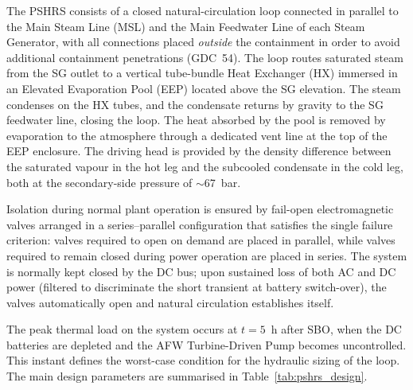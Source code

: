 \documentclass[a4paper,11pt]{article}
\numberwithin{subsubsection}{subsection}
\numberwithin{subsection}{section}
\begin{document}
The PSHRS consists of a closed natural-circulation loop connected in
parallel to the Main Steam Line (MSL) and the Main Feedwater Line of each
Steam Generator, with all connections placed \emph{outside} the containment
in order to avoid additional containment penetrations (GDC~54). The loop
routes saturated steam from the SG outlet to a vertical tube-bundle Heat
Exchanger (HX) immersed in an Elevated Evaporation Pool (EEP) located
above the SG elevation. The steam condenses on the HX tubes, and the
condensate returns by gravity to the SG feedwater line, closing the loop.
The heat absorbed by the pool is removed by evaporation to the atmosphere
through a dedicated vent line at the top of the EEP enclosure. The driving
head is provided by the density difference between the saturated vapour
in the hot leg and the subcooled condensate in the cold leg, both at the
secondary-side pressure of $\sim$67~bar.

Isolation during normal plant operation is ensured by fail-open
electromagnetic valves arranged in a series--parallel configuration that
satisfies the single failure criterion: valves required to open on demand
are placed in parallel, while valves required to remain closed during
power operation are placed in series. The system is normally kept closed
by the DC bus; upon sustained loss of both AC and DC power
(filtered to discriminate the short transient at battery switch-over),
the valves automatically open and natural circulation establishes itself.

The peak thermal load on the system occurs at $t = 5$~h after SBO, when
the DC batteries are depleted and the AFW Turbine-Driven Pump becomes
uncontrolled. This instant defines the worst-case condition for the
hydraulic sizing of the loop. The main design parameters are summarised
in Table~\ref{tab:pshrs_design}.
\end{document}
